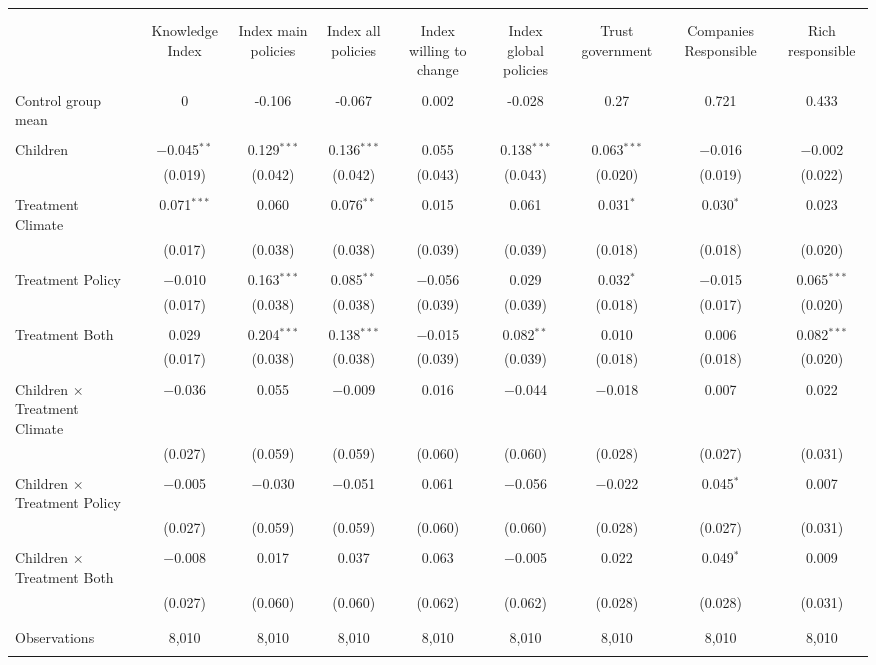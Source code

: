 
\begin{tabular}{@{\extracolsep{5pt}}lcccccccc} 
\\[-1.8ex]\hline 
\hline \\[-1.8ex] 
\\[-1.8ex] & Knowledge Index & Index main policies & Index all policies & Index willing to change & Index global policies & Trust government & Companies Responsible & Rich responsible \\ 
\hline \\[-1.8ex] 
 Control group mean & 0 & -0.106 & -0.067 & 0.002 & -0.028 & 0.27 & 0.721 & 0.433  \\ \hline \\[-1.8ex] Children & $-$0.045$^{**}$ & 0.129$^{***}$ & 0.136$^{***}$ & 0.055 & 0.138$^{***}$ & 0.063$^{***}$ & $-$0.016 & $-$0.002 \\ 
  & (0.019) & (0.042) & (0.042) & (0.043) & (0.043) & (0.020) & (0.019) & (0.022) \\ 
  & & & & & & & & \\ 
 Treatment Climate & 0.071$^{***}$ & 0.060 & 0.076$^{**}$ & 0.015 & 0.061 & 0.031$^{*}$ & 0.030$^{*}$ & 0.023 \\ 
  & (0.017) & (0.038) & (0.038) & (0.039) & (0.039) & (0.018) & (0.018) & (0.020) \\ 
  & & & & & & & & \\ 
 Treatment Policy & $-$0.010 & 0.163$^{***}$ & 0.085$^{**}$ & $-$0.056 & 0.029 & 0.032$^{*}$ & $-$0.015 & 0.065$^{***}$ \\ 
  & (0.017) & (0.038) & (0.038) & (0.039) & (0.039) & (0.018) & (0.017) & (0.020) \\ 
  & & & & & & & & \\ 
 Treatment Both & 0.029 & 0.204$^{***}$ & 0.138$^{***}$ & $-$0.015 & 0.082$^{**}$ & 0.010 & 0.006 & 0.082$^{***}$ \\ 
  & (0.017) & (0.038) & (0.038) & (0.039) & (0.039) & (0.018) & (0.018) & (0.020) \\ 
  & & & & & & & & \\ 
 Children $\times$ Treatment Climate & $-$0.036 & 0.055 & $-$0.009 & 0.016 & $-$0.044 & $-$0.018 & 0.007 & 0.022 \\ 
  & (0.027) & (0.059) & (0.059) & (0.060) & (0.060) & (0.028) & (0.027) & (0.031) \\ 
  & & & & & & & & \\ 
 Children $\times$ Treatment Policy & $-$0.005 & $-$0.030 & $-$0.051 & 0.061 & $-$0.056 & $-$0.022 & 0.045$^{*}$ & 0.007 \\ 
  & (0.027) & (0.059) & (0.059) & (0.060) & (0.060) & (0.028) & (0.027) & (0.031) \\ 
  & & & & & & & & \\ 
 Children $\times$ Treatment Both & $-$0.008 & 0.017 & 0.037 & 0.063 & $-$0.005 & 0.022 & 0.049$^{*}$ & 0.009 \\ 
  & (0.027) & (0.060) & (0.060) & (0.062) & (0.062) & (0.028) & (0.028) & (0.031) \\ 
  & & & & & & & & \\ 
\hline \\[-1.8ex] 

Observations & 8,010 & 8,010 & 8,010 & 8,010 & 8,010 & 8,010 & 8,010 & 8,010 \\ 
\hline 
\hline \\[-1.8ex] 
\end{tabular} 